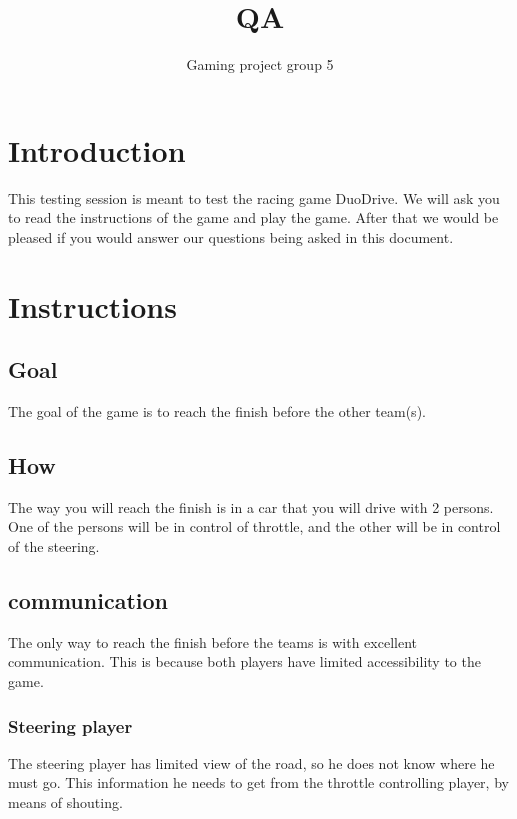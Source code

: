 \documentclass{article}
\title{QA}
\author{Gaming project group 5}
\date{}
\newcounter{question}
\begin{document}
\newcommand\Que[1]{%
   \leavevmode\par
   \stepcounter{question}
   \noindent
   \thequestion. Q --- #1\par}

\newcommand\Ans[2][]{%
    \leavevmode\par\noindent
   {\leftskip37pt
    A --- \textbf{#1}#2\par}}


\maketitle

\section{Introduction}
This testing session is meant to test the racing game DuoDrive\texttrademark. We will ask you to read the instructions of the game and play the game. After that we would be pleased if you would answer our questions being asked in this document.

\section{Instructions}
\subsection{Goal}
The goal of the game is to reach the finish before the other team(s). 
\subsection{How}
The way you will reach the finish is in a car that you will drive with 2 persons. One of the persons will be in control of throttle, and the other will be in control of the steering. 
\subsection{communication}
The only way to reach the finish before the teams is with excellent communication. This is because both players have limited accessibility to the game. 
\subsubsection{Steering player}
The steering player has limited view of the road, so he does not know where he must go. This information he needs to get from the throttle controlling player, by means of shouting.
\end{document}
